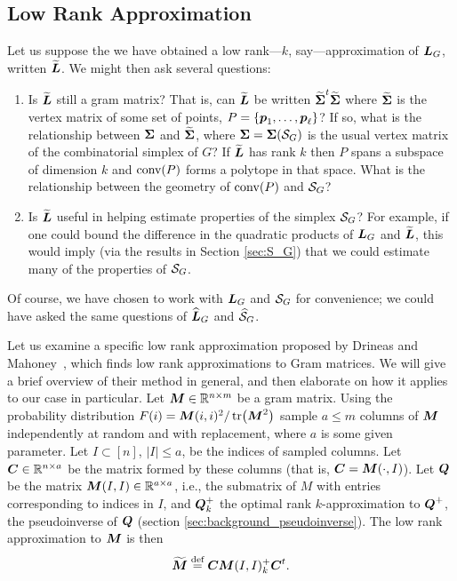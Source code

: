 \subsection{Low Rank Approximation}

Let us suppose the we have obtained a low rank---$k$, say---approximation of $\vb*{L}_G$, written $\widetilde{\vb*{L}}$. We might then ask several questions: 
\begin{enumerate}
	\item Is $\widetilde{\vb*{L}}$ still a gram matrix? That is, can $\widetilde{\vb*{L}}$ be written $\widetilde{\boldsymbol{\Sigma}}^t\widetilde{\boldsymbol{\Sigma}}$ where $\widetilde{\boldsymbol{\Sigma}}$ is the vertex matrix of some set of points, $P=\{\vb*{p}_1,\dots,\vb*{p}_\ell\}$? If so, what is the relationship between $\boldsymbol{\Sigma}$ and $\widetilde{\boldsymbol{\Sigma}}$, where $\boldsymbol{\Sigma}=\boldsymbol{\Sigma}(\mathcal{S}_G)$ is the usual vertex matrix of the combinatorial simplex of $G$? If $\widetilde{\vb*{L}}$ has rank $k$ then $P$ spans a subspace of dimension $k$ and $\textnormal{conv}(P)$ forms a polytope in that space. What is the relationship between the geometry of $\textnormal{conv}(P)$ and $\mathcal{S}_G$?
	\item Is $\widetilde{\vb*{L}}$ useful in helping estimate properties of the simplex $\mathcal{S}_G$? For example, if one could bound the difference in the quadratic products of $\vb*{L}_G$ and $\widetilde{\vb*{L}}$, this would imply (via the results in Section \ref{sec:S_G}) that we could estimate many of the properties of $\mathcal{S}_G$. 
	\end{enumerate}

Of course, we have chosen to work with $\vb*{L}_G$ and $\mathcal{S}_G$ for convenience; we could have asked the same questions of $\widehat{\vb*{L}}_G$ and $\widehat{\mathcal{S}}_G$. 

Let us examine a specific low rank approximation proposed by Drineas and Mahoney~\cite{drineas2005approximating}, which finds low rank approximations to Gram matrices. We will give a brief overview of their method in general, and then elaborate on how it applies to our case in particular. Let ${\vb*{M}}\in\mathbb{R}^{n\times m}$ be a gram matrix. Using the probability distribution $F(i) = {\vb*{M}}(i,i)^2 / \tr({\vb*{M}}^2)$ sample $a\leq m$ columns of ${\vb*{M}}$ independently at random and with replacement, where $a$ is some given parameter. Let $I\subset[n]$, $|I|\leq a$, be the indices of sampled columns. Let $\vb*{C}\in\mathbb{R}^{n\times a}$ be the matrix formed by these columns (that is, $\vb*{C}={\vb*{M}}(\cdot,I)$).  Let $\vb*{Q}$ be the matrix ${\vb*{M}}(I,I)\in\mathbb{R}^{a\times a}$, i.e., the submatrix of $M$ with entries corresponding to indices in $I$, and $\vb*{Q}^+_k$  the optimal rank $k$-approximation to $\vb*{Q}^+$, the pseudoinverse of $\vb*{Q}$ (section \ref{sec:background_pseudoinverse}). The low rank approximation to ${\vb*{M}}$ is then 
\begin{equation*}
\widetilde{{\vb*{M}}} \overset{\text{def}}{=} \vb*{C}{\vb*{M}}(I,I)_k^+\vb*{C}^t.
\end{equation*}

